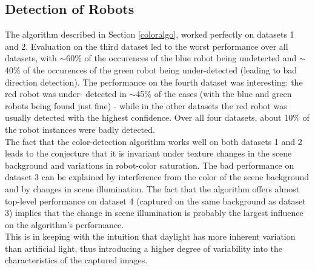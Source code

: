 \documentclass[10pt,a4paper]{article}
\begin{document}
\subsection{Detection of Robots}\label{colorresults}
The algorithm described in Section \ref{coloralgo}, worked perfectly on 
datasets 1 and 2.
Evaluation on the third dataset led to the worst performance over all datasets, 
with $\sim$60\% of the occurences of the blue robot being undetected and 
$\sim$40\% of the occurences of the green robot being under-detected (leading 
to bad direction detection).
The performance on the fourth dataset was interesting: the red robot was under-
detected in $\sim$45\% of the cases (with the blue and green robots being
found just fine) - while in the other datasets the red robot was usually
detected with the highest confidence.
Over all four datasets, about 10\% of the robot instances were badly detected.\\
The fact that the color-detection algorithm works well on both datasets 1 and 2
leads to the conjecture that it is invariant under texture changes in the scene 
background and variations in robot-color saturation.
The bad performance on dataset 3 can be explained by interference from the color
of the scene background and by changes in scene illumination. The fact that the
algorithm offers almost top-level performance on dataset 4 (captured on the same
background as dataset 3) implies that the change in scene illumination is
probably the largest influence on the algorithm's performance.\\
This is in keeping with the intuition that daylight has more inherent variation
than artificial light, thus introducing a higher degree of variability into the
characteristics of the captured images.
\end{document}
